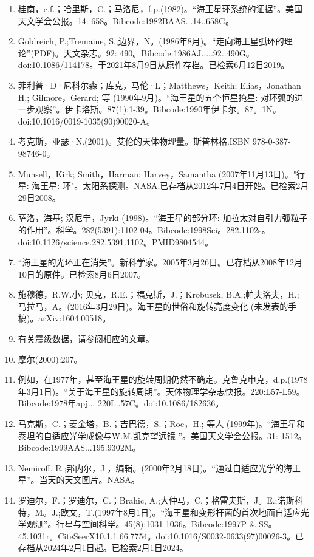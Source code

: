 \begin{enumerate}
\item 桂南，e.f.；哈里斯，C.；马洛尼，f.p.(1982)。“海王星环系统的证据”。美国天文学会公报。14: 658。Bibcode:1982BAAS...14..658G。
\item Goldreich, P.;Tremaine, S.;边界，N。(1986年8月)。“走向海王星弧环的理论”(PDF)。天文杂志。92: 490。Bibcode:1986AJ.....92..490G。doi:10.1086/114178。于2021年8月9日从原件存档。已检索6月12日2019。
\item 菲利普·D·尼科尔森；库克，马伦·L；Matthews，Keith; Elias，Jonathan H.; Gilmore，Gerard; 等 (1990年9月)。“海王星的五个恒星掩星: 对环弧的进一步观察”。伊卡洛斯。87(1):1-39。Bibcode:1990年伊卡尔。87。1N。doi:10.1016/0019-1035(90)90020-A。
\item 考克斯，亚瑟·N.(2001)。艾伦的天体物理量。斯普林格.ISBN 978-0-387-98746-0。
\item Munsell，Kirk; Smith，Harman; Harvey，Samantha (2007年11月13日)。"行星: 海王星: 环"。太阳系探测。NASA.已存档从2012年7月4日开始。已检索2月29日2008。
\item 萨洛，海基; 汉尼宁，Jyrki (1998)。“海王星的部分环: 加拉太对自引力弧粒子的作用”。科学。282(5391):1102-04。Bibcode:1998Sci。282.1102s。doi:10.1126/science.282.5391.1102。PMID9804544。 
\item “海王星的光环正在消失”。新科学家。2005年3月26日。已存档从2008年12月10日的原件。已检索8月6日2007。
\item 施穆德，R.W.小; 贝克，R.E.；福克斯，J.；Krobusek, B.A.;帕夫洛夫，H.; 马拉马，A。(2016年3月29日)。海王星的世俗和旋转亮度变化 (未发表的手稿)。arXiv:1604.00518。
\item 有关震级数据，请参阅相应的文章。
\item 摩尔(2000):207。
\item 例如，在1977年，甚至海王星的旋转周期仍然不确定。克鲁克申克，d.p.(1978年3月1日)。“关于海王星的旋转周期”。天体物理学杂志快报。220:L57-L59。Bibcode:1978年apj... 220L..57C。doi:10.1086/182636。
\item 马克斯，C.；麦金塔，B.；吉巴德，S.；Roe，H.; 等人 (1999年)。“海王星和泰坦的自适应光学成像与W.M.凯克望远镜 ”。美国天文学会公报。31: 1512。Bibcode:1999AAS...195.9302M。
\item Nemiroff, R.;邦内尔，J.，编辑。(2000年2月18日)。“通过自适应光学的海王星”。当天的天文图片。NASA。
\item 罗迪尔，F.；罗迪尔，C.；Brahic, A.;大仲马，C.；格雷夫斯，J。E.;诺斯科特，M。J.;欧文，T.(1997年8月1日)。“海王星和变形杆菌的首次地面自适应光学观测”。行星与空间科学。45(8):1031-1036。Bibcode:1997P & SS。45.1031r。CiteSeerX10.1.1.66.7754。doi:10.1016/S0032-0633(97)00026-3。已存档从2024年2月1日起。已检索2月1日2024。 

\end{enumerate}
